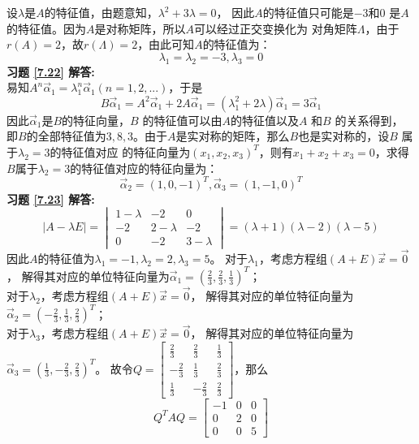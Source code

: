 \documentclass[a4paper]{book}
\begin{document}
设$\lambda$是$A$的特征值，由题意知，$\lambda^2+3\lambda=0$，
因此$A$的特征值只可能是$-3$和$0$ 是$A$ 的特征值。因为$A$是对称矩阵，所以$A$可以经过正交变换化为
对角矩阵$\Lambda$，由于$r(A)=2$，故$r(\Lambda)=2$，由此可知$A$的特征值为：
\begin{equation*}
  \lambda_1=\lambda_2=-3,\lambda_3=0
\end{equation*}
\textbf{习题 \ref{7.22} 解答:}\\
易知$A^n\vec{\alpha}_1=\lambda_1^n\vec{\alpha}_1(n=1,2,...)$，于是
\begin{equation*}
  B\vec{\alpha}_1=A^2\vec{\alpha}_1+2A\vec{\alpha}_1=(\lambda_1^2+2\lambda)\vec{\alpha}_1=3\vec{\alpha}_1
\end{equation*}
因此$\vec{\alpha}_1$是$B$的特征向量，$B$ 的特征值可以由$A$的特征值以及$A$ 和$B$ 的关系得到，
即$B$的全部特征值为$3,8,3$。由于$A$是实对称的矩阵，那么$B$也是实对称的，设$B$ 属于$\lambda_2=3$的特征值对应
的特征向量为$(x_1,x_2,x_3)^T$，则有$x_1+x_2+x_3=0$，求得$B$属于$\lambda_2=3$的特征值对应的特征向量为：
\begin{equation*}
  \vec{\alpha}_2=(1,0,-1)^T,\vec{\alpha}_3=(1,-1,0)^T
\end{equation*}
\textbf{习题 \ref{7.23} 解答:}\\
\begin{equation*}
 |A-\lambda E| = \begin{vmatrix}1-\lambda&-2&0\\-2&2-\lambda&-2\\0&-2&3-\lambda\end{vmatrix}
               =(\lambda+1)(\lambda-2)(\lambda-5)
\end{equation*}
因此$A$的特征值为$\lambda_1=-1,\lambda_2=2,\lambda_3=5$。
对于$\lambda_1$，考虑方程组$(A+E)\vec{x}=\vec{0}$，
解得其对应的单位特征向量为$\vec{\alpha}_1=(\frac{2}{3},\frac{2}{3},\frac{1}{3})^T$；\\
对于$\lambda_2$，考虑方程组$(A+E)\vec{x}=\vec{0}$，
解得其对应的单位特征向量为$\vec{\alpha}_2=(-\frac{2}{3},\frac{1}{3},\frac{2}{3})^T$；\\
对于$\lambda_3$，考虑方程组$(A+E)\vec{x}=\vec{0}$，
解得其对应的单位特征向量为$\vec{\alpha}_3=(\frac{1}{3},-\frac{2}{3},\frac{2}{3})^T$。
故令$Q=\begin{bmatrix}\frac{2}{3}&\frac{2}{3}&\frac{1}{3}\\-\frac{2}{3}&\frac{1}{3}&\frac{2}{3}\\
\frac{1}{3}&-\frac{2}{3}&\frac{2}{3}\end{bmatrix}$，那么
\begin{equation*}
  Q^TAQ=\begin{bmatrix}-1&0&0\\0&2&0\\0&0&5\end{bmatrix}
\end{equation*}
\end{document}
